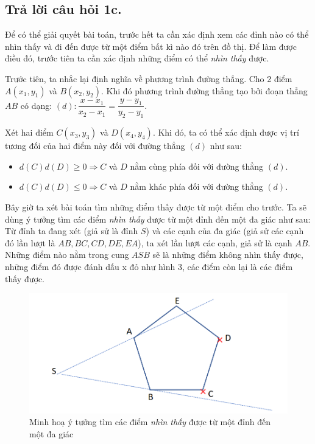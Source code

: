 \documentclass[a4paper, 11pt]{article}
\begin{document}
\subsection{Trả lời câu hỏi 1c.}
Để có thể giải quyết bài toán, trước hết ta cần xác định xem các đỉnh nào có thể nhìn thấy và đi đến được từ một điểm bất kì nào đó trên đồ thị. Để làm được điều đó, trước tiên ta cần xác định những điểm có thể \textit{nhìn thấy} được.

Trước tiên, ta nhắc lại định nghĩa về phương trình đường thẳng. Cho 2 điểm $A(x_1, y_1)$ và $B(x_2, y_2) $. Khi đó phương trình đường thẳng tạo bởi đoạn thẳng $AB$ có dạng: $(d): \dfrac{x - x_1}{x_2 - x_1} = \dfrac{y - y_1}{y_2 - y_1}$.

Xét hai điểm $C(x_3, y_3)$ và $D(x_4, y_4)$. Khi đó, ta có thể xác định được vị trí tương đối của hai điểm này đối với đường thẳng $(d)$ như sau:

\begin{itemize}
  \item $d(C)d(D) \geq 0 \Rightarrow C$ và $D$ nằm cùng phía đối với đường thẳng $(d)$.
  \item $d(C)d(D) \leq 0 \Rightarrow C$ và $D$ nằm khác phía đối với đường thẳng $(d)$.
\end{itemize}

Bây giờ ta xét bài toán tìm những điểm thấy được từ một điểm cho trước. Ta sẽ dùng ý tưởng tìm các điểm \textit{nhìn thấy} được từ một đỉnh đến một đa giác như sau: Từ đỉnh ta đang xét (giả sử là đỉnh $S$) và các cạnh của đa giác (giả sử các cạnh đó lần lượt là $AB, BC, CD, DE, EA$), ta xét lần lượt các cạnh, giả sử là cạnh $AB$. Những điểm nào nằm trong cung $ASB$ sẽ là những điểm không nhìn thấy được, những điểm đó được đánh dấu x đỏ như hình 3, các điểm còn lại là các điểm thấy được.


\begin{figure}[h]
  \centering
  \includegraphics[width=.75\textwidth,height=.75\textheight,keepaspectratio]{can_see.png}
  \caption{Minh hoạ ý tưởng tìm các điểm \textit{nhìn thấy} được từ một đỉnh đến một đa giác}
\end{figure}
\end{document}
